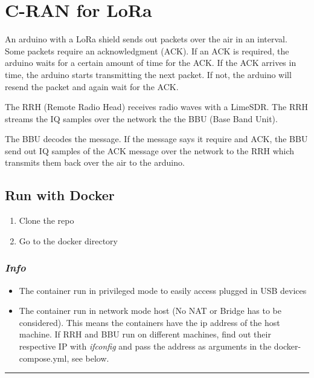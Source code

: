 \section{C-RAN for LoRa}\label{c-ran-for-lora}

An arduino with a LoRa shield sends out packets over the air in an
interval. Some packets require an acknowledgment (ACK). If an ACK is
required, the arduino waits for a certain amount of time for the ACK. If
the ACK arrives in time, the arduino starts transmitting the next
packet. If not, the arduino will resend the packet and again wait for
the ACK.

The RRH (Remote Radio Head) receives radio waves with a LimeSDR. The RRH
streams the IQ samples over the network the the BBU (Base Band Unit).

The BBU decodes the message. If the message says it require and ACK, the
BBU send out IQ samples of the ACK message over the network to the RRH
which transmits them back over the air to the arduino.

\subsection{Run with Docker}\label{run-with-docker}

\begin{enumerate}
\def\labelenumi{\arabic{enumi}.}
\tightlist
\item
  Clone the repo
\item
  Go to the docker directory
\end{enumerate}

\subsubsection{\texorpdfstring{\textbf{\emph{Info}}}{Info}}\label{info}

\begin{itemize}
\tightlist
\item
  The container run in privileged mode to easily access plugged in USB
  devices
\item
  The container run in network mode host (No NAT or Bridge has to be
  considered). This means the containers have the ip address of the host
  machine. If RRH and BBU run on different machines, find out their
  respective IP with \emph{ifconfig} and pass the address as arguments
  in the docker-compose.yml, see below.
\end{itemize}

\begin{center}\rule{0.5\linewidth}{\linethickness}\end{center}

